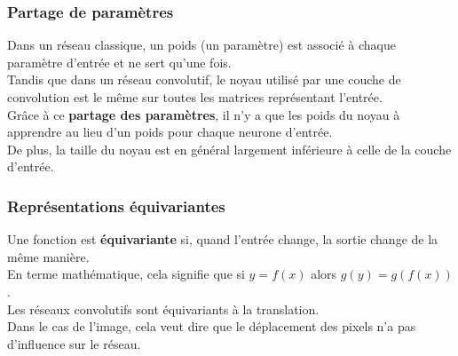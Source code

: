 \documentclass[11pt]{article}
\begin{document}
\subsubsection{Partage de paramètres}
\label{sec:org155f20c}
Dans un réseau classique, un poids (un paramètre) est associé à chaque paramètre d'entrée et ne sert qu'une fois.\\
Tandis que dans un réseau convolutif, le noyau utilisé par une couche de convolution est le même sur toutes les matrices représentant l'entrée.\\
Grâce à ce \textbf{partage des paramètres}, il n'y a que les poids du noyau à apprendre au lieu d'un poids pour chaque neurone d'entrée.\\
De plus, la taille du noyau est en général largement inférieure à celle de la couche d'entrée.\\

\subsubsection{Représentations équivariantes}
\label{sec:orgd193a52}
Une fonction est \textbf{équivariante} si, quand l'entrée change, la sortie change de la même manière.\\
En terme mathématique, cela signifie que si \(y = f(x)\) alors \(g(y) = g(f(x))\).\\
Les réseaux convolutifs sont équivariants à la translation.\\
Dans le cas de l'image, cela veut dire que le déplacement des pixels n'a pas d'influence sur le réseau.\\
\end{document}
